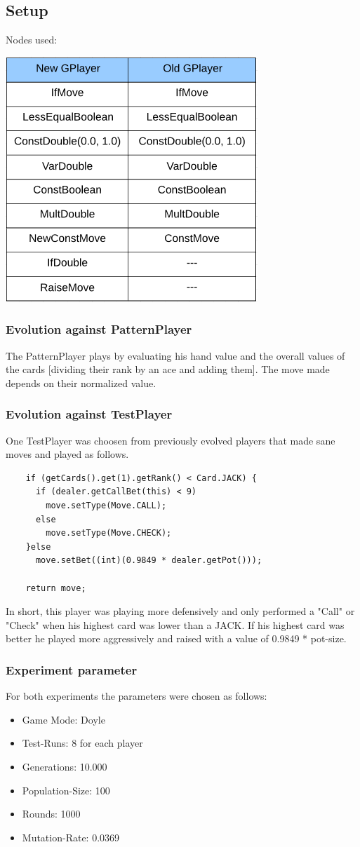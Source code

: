 \documentclass[12pt,fleqn,a4paper]{article}
\begin{document}
\subsection{Setup}
Nodes used:
\begin{flushleft}
	\includegraphics[width=.3\textwidth]{node_table.png}
\end{flushleft}	

\subsubsection{Evolution against PatternPlayer}
The PatternPlayer plays by evaluating his hand value and the overall values of the cards [dividing their rank by an ace and adding them].
The move made depends on their normalized value.

\subsubsection{Evolution against TestPlayer}
One TestPlayer was choosen from previously evolved players that made sane moves and played as follows.
\\
\begin{lstlisting}
	if (getCards().get(1).getRank() < Card.JACK) {
	  if (dealer.getCallBet(this) < 9)
		move.setType(Move.CALL);
	  else
		move.setType(Move.CHECK);
	}else
	  move.setBet((int)(0.9849 * dealer.getPot()));
		
	return move;
\end{lstlisting}

In short, this player was playing more defensively and only performed a "Call" or "Check" when his highest card was lower than a JACK. If his highest card was better he played more aggressively and raised with a value of 0.9849 * pot-size.

\newpage
\subsubsection{Experiment parameter}
For both experiments the parameters were chosen as follows: 
\begin{itemize}
	\item Game Mode:       Doyle
	\item Test-Runs:       8 for each player
	\item Generations:     10.000
	\item Population-Size: 100
	\item Rounds:          1000
	\item Mutation-Rate:   0.0369
\end{itemize} 
\end{document}
